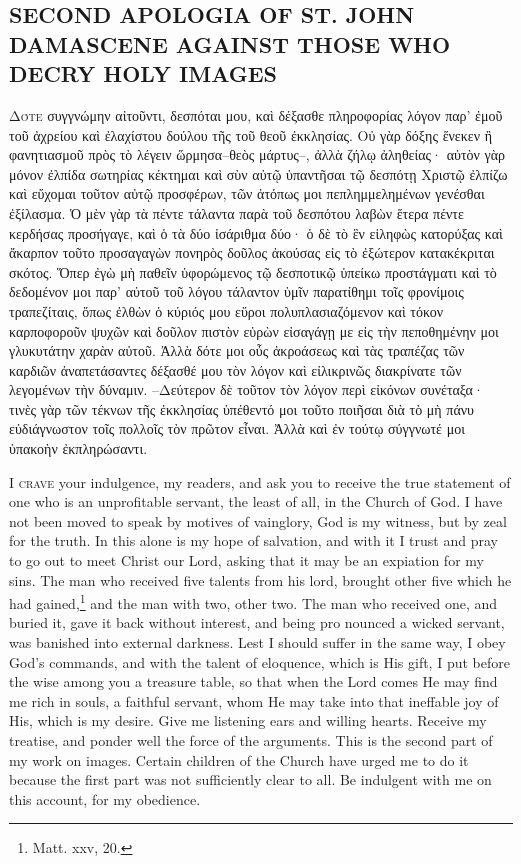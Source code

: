 \documentclass[10pt]{book}
\newcommand{\switchgreek}[1][]{\selectlanguage{polutonikogreek} \switchcolumn*[#1]}
\newcommand{\switchenglish}{\selectlanguage{english} \switchcolumn}
\begin{document}
\begin{paracol}{2}
\switchenglish

\section*{SECOND APOLOGIA OF ST. JOHN DAMASCENE AGAINST THOSE WHO DECRY HOLY IMAGES}

\switchgreek

\lettrine{Δ}{ότε} συγγνώμην αἰτοῦντι,
δεσπόται μου, καὶ δέξασθε πληροφορίας λόγον παρ’ ἐμοῦ
τοῦ ἀχρείου καὶ ἐλαχίστου δούλου τῆς τοῦ θεοῦ ἐκκλησίας. Οὐ γὰρ δόξης ἕνεκεν ἢ
φανητιασμοῦ πρὸς τὸ λέγειν ὥρμησα–θεὸς μάρτυς–, ἀλλὰ ζήλῳ ἀληθείας· αὐτὸν γὰρ
μόνον ἐλπίδα σωτηρίας κέκτημαι καὶ σὺν αὐτῷ ὑπαντῆσαι τῷ δεσπότῃ Χριστῷ ἐλπίζω
καὶ εὔχομαι τοῦτον αὐτῷ προσφέρων, τῶν ἀτόπως μοι πεπλημμελημένων γενέσθαι
ἐξίλασμα. Ὁ μὲν γὰρ τὰ πέντε τάλαντα παρὰ τοῦ δεσπότου λαβὼν ἕτερα πέντε
κερδήσας προσήγαγε, καὶ ὁ τὰ δύο ἰσάριθμα δύο· ὁ δὲ τὸ ἓν εἰληφὼς κατορύξας
καὶ ἄκαρπον τοῦτο προσαγαγὼν πονηρὸς δοῦλος ἀκούσας εἰς τὸ ἐξώτερον
κατακέκριται σκότος. Ὅπερ ἐγὼ μὴ παθεῖν ὑφορώμενος τῷ δεσποτικῷ ὑπείκω
προστάγματι καὶ τὸ δεδομένον μοι παρ’ αὐτοῦ τοῦ λόγου τάλαντον ὑμῖν παρατίθημι
τοῖς φρονίμοις τραπεζίταις, ὅπως ἐλθὼν ὁ κύριός μου εὕροι πολυπλασιαζόμενον
καὶ τόκον καρποφοροῦν ψυχῶν καὶ δοῦλον πιστὸν εὑρὼν εἰσαγάγῃ με εἰς τὴν
πεποθημένην μοι γλυκυτάτην χαρὰν αὐτοῦ. Ἀλλὰ δότε μοι οὖς ἀκροάσεως καὶ τὰς
τραπέζας τῶν καρδιῶν ἀναπετάσαντες δέξασθέ μου τὸν λόγον καὶ εἰλικρινῶς
διακρίνατε τῶν λεγομένων τὴν δύναμιν. –Δεύτερον δὲ τοῦτον τὸν λόγον περὶ
εἰκόνων συνέταξα· τινὲς γὰρ τῶν τέκνων τῆς ἐκκλησίας ὑπέθεντό μοι τοῦτο
ποιῆσαι διὰ τὸ μὴ πάνυ εὐδιάγνωστον τοῖς πολλοῖς τὸν πρῶτον εἶναι. Ἀλλὰ καὶ ἐν
τούτῳ σύγγνωτέ μοι ὑπακοὴν ἐκπληρώσαντι.

\switchenglish

\lettrine{I}{ crave} your indulgence, my readers,
and ask you to receive the true statement 
of one who is an unprofitable servant, the least 
of all, in the Church of God. I have not been 
moved to speak by motives of vainglory, God 
is my witness, but by zeal for the truth. In 
this alone is my hope of salvation, and with it 
I trust and pray to go out to meet Christ our 
Lord, asking that it may be an expiation for 
my sins. The man who received five talents 
from his lord, brought other five which he had 
gained,\footnote{Matt. xxv, 20.} and the man with two, other two. 
The man who received one, and buried it, 
gave it back without interest, and being pro 
nounced a wicked servant, was banished into 
external darkness. Lest I should suffer in the 
same way, I obey God's commands, and with 
the talent of eloquence, which is His gift, I put 
before the wise among you a treasure table, so 
that when the Lord comes He may find me 
rich in souls, a faithful servant, whom He may 
take into that ineffable joy of His, which is my 
desire. Give me listening ears and willing
hearts. Receive my treatise, and ponder well 
the force of the arguments. This is the second 
part of my work on images. Certain children 
of the Church have urged me to do it because 
the first part was not sufficiently clear to all. 
Be indulgent with me on this account, for my 
obedience. 


\end{paracol}
\end{document}
